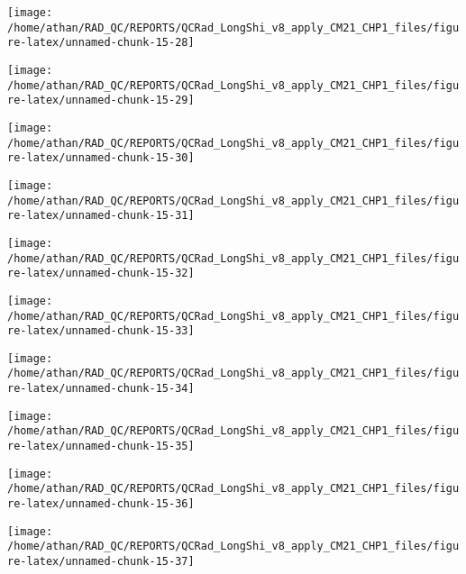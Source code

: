 \documentclass[
  10pt,
  a4paper,oneside]{article}
\begin{document}
\begin{center}\texttt{[image: /home/athan/RAD\_QC/REPORTS/QCRad\_LongShi\_v8\_apply\_CM21\_CHP1\_files/figure-latex/unnamed-chunk-15-28]} \end{center}

\begin{center}\texttt{[image: /home/athan/RAD\_QC/REPORTS/QCRad\_LongShi\_v8\_apply\_CM21\_CHP1\_files/figure-latex/unnamed-chunk-15-29]} \end{center}

\begin{center}\texttt{[image: /home/athan/RAD\_QC/REPORTS/QCRad\_LongShi\_v8\_apply\_CM21\_CHP1\_files/figure-latex/unnamed-chunk-15-30]} \end{center}

\begin{center}\texttt{[image: /home/athan/RAD\_QC/REPORTS/QCRad\_LongShi\_v8\_apply\_CM21\_CHP1\_files/figure-latex/unnamed-chunk-15-31]} \end{center}

\begin{center}\texttt{[image: /home/athan/RAD\_QC/REPORTS/QCRad\_LongShi\_v8\_apply\_CM21\_CHP1\_files/figure-latex/unnamed-chunk-15-32]} \end{center}

\begin{center}\texttt{[image: /home/athan/RAD\_QC/REPORTS/QCRad\_LongShi\_v8\_apply\_CM21\_CHP1\_files/figure-latex/unnamed-chunk-15-33]} \end{center}

\begin{center}\texttt{[image: /home/athan/RAD\_QC/REPORTS/QCRad\_LongShi\_v8\_apply\_CM21\_CHP1\_files/figure-latex/unnamed-chunk-15-34]} \end{center}

\begin{center}\texttt{[image: /home/athan/RAD\_QC/REPORTS/QCRad\_LongShi\_v8\_apply\_CM21\_CHP1\_files/figure-latex/unnamed-chunk-15-35]} \end{center}

\begin{center}\texttt{[image: /home/athan/RAD\_QC/REPORTS/QCRad\_LongShi\_v8\_apply\_CM21\_CHP1\_files/figure-latex/unnamed-chunk-15-36]} \end{center}

\begin{center}\texttt{[image: /home/athan/RAD\_QC/REPORTS/QCRad\_LongShi\_v8\_apply\_CM21\_CHP1\_files/figure-latex/unnamed-chunk-15-37]} \end{center}
\end{document}
